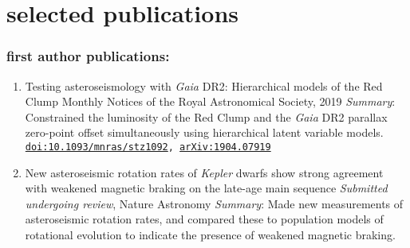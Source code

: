 \documentclass[letterpaper]{k-cv} %
\begin{document}

\vspace{0.5cm}
\section{\color{c2}selected publications}
\vspace{-0.5cm}
\subsubsection*{\color{c2}first author publications:}
\vspace{-0.2cm}
\begin{enumerate}
	\item {}
	{Testing asteroseismology with \textit{Gaia} DR2: Hierarchical models of the Red Clump}
	{Monthly Notices of the Royal Astronomical Society, 2019}
	{\textit{Summary}: Constrained the luminosity of the Red Clump and the \textit{Gaia} DR2 parallax zero-point offset simultaneously using hierarchical latent variable models.}
	{\texttt{\href{https://academic.oup.com/mnras/article-abstract/486/3/3569/5475128}{doi:10.1093/mnras/stz1092}, \href{https://arxiv.org/abs/1904.07919}{arXiv:1904.07919}}}
	
	\item {}
	{New asteroseismic rotation rates of \textit{Kepler} dwarfs show strong agreement with weakened magnetic braking on the late-age main sequence}
	{\textit{Submitted undergoing review}, Nature Astronomy}
	{\textit{Summary}: Made new measurements of asteroseismic rotation rates, and compared these to population models of rotational evolution to indicate the presence of weakened magnetic braking.}
	{}	
\end{enumerate}
\end{document}
